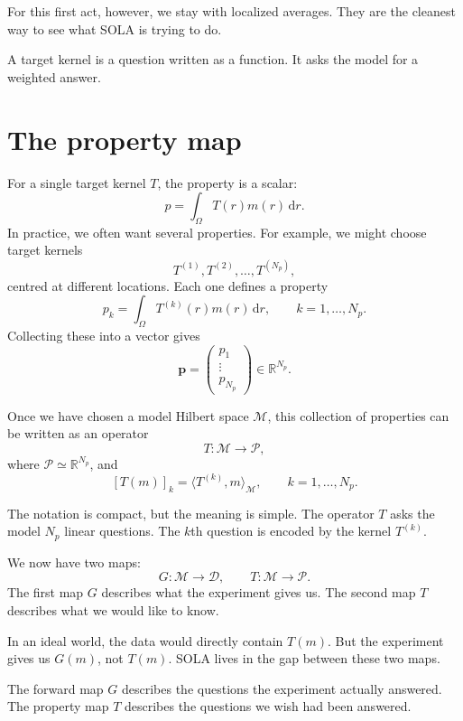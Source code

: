 \documentclass[11pt,openany]{book}
\theoremstyle{definition}
\theoremstyle{remark}
\newcommand{\M}{\mathcal M}
\newcommand{\D}{\mathcal D}
\newcommand{\Pspace}{\mathcal P}
\newcommand{\dd}{\,\mathrm d}
\begin{document}
For this first act, however, we stay with localized averages. They are the cleanest way to see
what SOLA is trying to do.

\begin{lessonbox}
A target kernel is a question written as a function. It asks the model for a weighted answer.
\end{lessonbox}

\section{The property map}

For a single target kernel \(T\), the property is a scalar:
\[
  p=\int_\Omega T(r)m(r)\dd r.
\]
In practice, we often want several properties. For example, we might choose target kernels
\[
  T^{(1)},T^{(2)},\dots,T^{(N_p)},
\]
centred at different locations. Each one defines a property
\[
  p_k
  =
  \int_\Omega T^{(k)}(r)m(r)\dd r,
  \qquad k=1,\dots,N_p.
\]
Collecting these into a vector gives
\[
  \mathbf p
  =
  \begin{pmatrix}
    p_1\\
    \vdots\\
    p_{N_p}
  \end{pmatrix}
  \in\mathbb R^{N_p}.
\]

Once we have chosen a model Hilbert space \(\M\), this collection of properties can be written
as an operator
\[
  T:\M\to\Pspace,
\]
where \(\Pspace\simeq\mathbb R^{N_p}\), and
\[
  [T(m)]_k
  =
  \langle T^{(k)},m\rangle_{\M},
  \qquad k=1,\dots,N_p.
\]

The notation is compact, but the meaning is simple. The operator \(T\) asks the model
\(N_p\) linear questions. The \(k\)th question is encoded by the kernel \(T^{(k)}\).

We now have two maps:
\[
  G:\M\to\D,
  \qquad
  T:\M\to\Pspace.
\]
The first map \(G\) describes what the experiment gives us. The second map \(T\) describes what
we would like to know.

In an ideal world, the data would directly contain \(T(m)\). But the experiment gives us
\(G(m)\), not \(T(m)\). SOLA lives in the gap between these two maps.

\begin{checkpointbox}
The forward map \(G\) describes the questions the experiment actually answered. The property
map \(T\) describes the questions we wish had been answered.
\end{checkpointbox}
\end{document}

